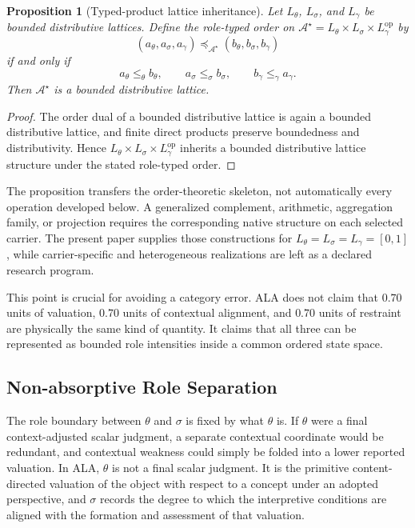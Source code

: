 \documentclass[reqno,final]{amsart}
\theoremstyle{definition}
\theoremstyle{plain}
\newtheorem{proposition}{Proposition}
\theoremstyle{remark}
\begin{document}
\begin{proposition}[Typed-product lattice inheritance]
\label{prop:typed-product-lattice-inheritance}
Let \(L_\theta\), \(L_\sigma\), and \(L_\gamma\) be bounded distributive lattices. Define the role-typed order on \(\mathcal A^{\star}=L_\theta\times L_\sigma\times L_\gamma^{\mathrm{op}}\) by
\[
(a_\theta,a_\sigma,a_\gamma)
\preceq_{\mathcal A^{\star}}
(b_\theta,b_\sigma,b_\gamma)
\]
if and only if
\[
a_\theta\leq_\theta b_\theta,
\qquad
a_\sigma\leq_\sigma b_\sigma,
\qquad b_\gamma\leq_\gamma a_\gamma.
\]
Then \(\mathcal A^{\star}\) is a bounded distributive lattice.
\end{proposition}

\begin{proof}
The order dual of a bounded distributive lattice is again a bounded distributive lattice, and finite direct products preserve boundedness and distributivity. Hence \(L_\theta\times L_\sigma\times L_\gamma^{\mathrm{op}}\) inherits a bounded distributive lattice structure under the stated role-typed order.
\end{proof}

The proposition transfers the order-theoretic skeleton, not automatically every operation developed below. A generalized complement, arithmetic, aggregation family, or projection requires the corresponding native structure on each selected carrier. The present paper supplies those constructions for \(L_\theta=L_\sigma=L_\gamma=[0,1]\), while carrier-specific and heterogeneous realizations are left as a declared research program.

This point is crucial for avoiding a category error. ALA does not claim that \(0.70\) units of valuation, \(0.70\) units of contextual alignment, and \(0.70\) units of restraint are physically the same kind of quantity. It claims that all three can be represented as bounded role intensities inside a common ordered state space.

\subsection{Non-absorptive Role Separation}
\label{subsec:role_separated_elicitation}

The role boundary between \(\theta\) and \(\sigma\) is fixed by what \(\theta\) is. If \(\theta\) were a final context-adjusted scalar judgment, a separate contextual coordinate would be redundant, and contextual weakness could simply be folded into a lower reported valuation. In ALA, \(\theta\) is not a final scalar judgment. It is the primitive content-directed valuation of the object with respect to a concept under an adopted perspective, and \(\sigma\) records the degree to which the interpretive conditions are aligned with the formation and assessment of that valuation.
\end{document}
